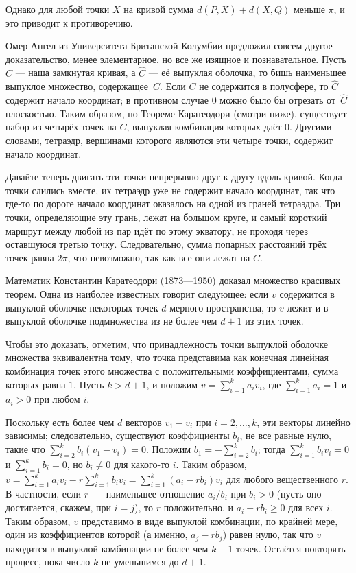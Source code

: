Однако для любой точки $X$ на кривой сумма $d(P, X) + d(X, Q)$ меньше $\pi$, и это приводит к противоречию.

Омер Ангел из Университета Британской Колумбии
предложил совсем другое доказательство,
менее элементарное, но все же изящное и познавательное.
Пусть $C$ --- наша замкнутая кривая, а $\hat C$ --- её выпуклая оболочка, то бишь наименьшее выпуклое множество, содержащее~$C$.
Если $C$ не содержится в полусфере, то $\hat C$ содержит начало координат;
в противном случае $0$ можно было бы отрезать от~$\hat C$ плоскостью.
Таким образом, по Теореме Каратеодори (смотри ниже), существует набор из четырёх точек на $C$, выпуклая комбинация которых даёт $0$.
Другими словами, тетраэдр, вершинами которого являются эти четыре точки, содержит начало координат.

Давайте теперь двигать эти точки непрерывно друг к другу вдоль кривой.
Когда точки слились вместе, их тетраэдр уже не содержит начало координат, так что где-то по дороге начало координат оказалось на одной из граней тетраэдра.
Три точки, определяющие эту грань, лежат на большом круге, и самый короткий маршрут между любой из пар идёт по этому экватору, не проходя через оставшуюся третью точку.
Следовательно, сумма попарных расстояний трёх точек равна $2\pi$, что невозможно, так как все они лежат на $C$.

Математик Константин Каратеодори (1873---1950) доказал множество красивых теорем.
Одна из наиболее известных говорит следующее: если $v$ содержится в выпуклой оболочке некоторых точек $d$-мерного  пространства, то $v$ лежит и в выпуклой оболочке подмножества из не более чем $d+1$ из этих точек.

Чтобы это доказать, отметим, что принадлежность точки выпуклой оболочке множества
эквивалентна тому, что точка представима как конечная линейная комбинация точек этого множества с положительными коэффициентами, сумма которых равна $1$.
Пусть $k>d+1$, и положим $v=\sum_{i=1}^k a_iv_i$, где $\sum_{i=1}^k a_i=1$ и $a_i>0$ при любом $i$.

Поскольку есть более чем $d$ векторов $v_1-v_i$ при $i=2,\dots,k$, эти векторы линейно зависимы;
следовательно, существуют коэффициенты $b_i$, не все равные нулю, такие что $\sum_{i=2}^k b_i(v_1-v_i)=0$.
Положим $b_1=-\sum_{i=2}^k b_i$; тогда $\sum_{i=1}^k b_i v_i=0$ и $\sum_{i=1}^k b_i=0$, но $b_i\ne 0$ для какого-то $i$.
Таким образом, $v=\sum_{i=1}^k a_iv_i-r\sum_{i=1}^k b_iv_i=\sum_{i=1}^k (a_i-rb_i)v_i$ для любого вещественного $r$.
В частности, если $r$~--- наименьшее отношение $a_i/b_i$  при $b_i>0$ (пусть оно достигается, скажем, при $i=j$), то $r$ положительно, и $a_i-rb_i\ge0$ для всех $i$.
Таким образом, $v$ представимо в виде выпуклой комбинации, по крайней мере, один из коэффициентов которой (а именно, $a_j-rb_j$) равен нулю, так что $v$ находится в выпуклой комбинации не более чем $k-1$ точек.
Остаётся повторять процесс, пока число $k$ не уменьшимся до $d+1$.


